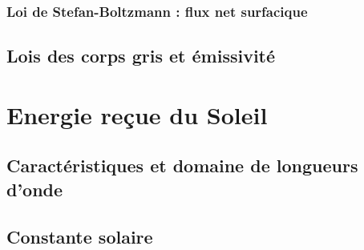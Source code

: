 		

		\sk \subsubsection{Loi de Stefan-Boltzmann : flux net surfacique}

		

	\sk \subsection{Lois des corps gris et émissivité}

		

\mk \section{Energie reçue du Soleil}

	\sk \subsection{Caractéristiques et domaine de longueurs d'onde}

		

	\sk \subsection{Constante solaire}

		
		
